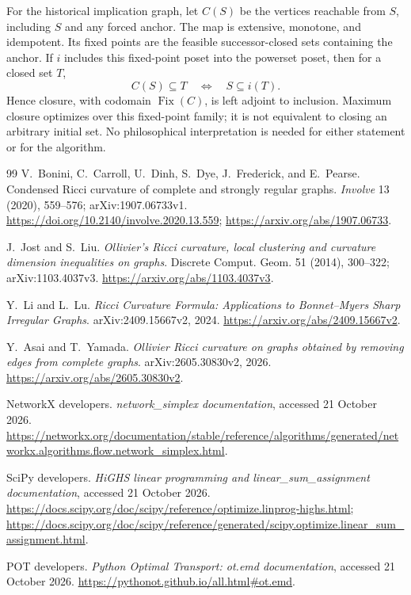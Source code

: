 \documentclass[11pt]{article}
\theoremstyle{remark}
\newcommand{\Fix}{\operatorname{Fix}}
\begin{document}
For the historical implication graph, let $C(S)$ be the vertices reachable from $S$, including $S$ and any forced anchor. The map is extensive, monotone, and idempotent. Its fixed points are the feasible successor-closed sets containing the anchor. If $i$ includes this fixed-point poset into the powerset poset, then for a closed set $T$,
\[
 C(S)\subseteq T\quad\Longleftrightarrow\quad S\subseteq i(T).
\]
Hence closure, with codomain $\Fix(C)$, is left adjoint to inclusion. Maximum closure optimizes over this fixed-point family; it is not equivalent to closing an arbitrary initial set. No philosophical interpretation is needed for either statement or for the algorithm.

\begin{thebibliography}{99}
V.~Bonini, C.~Carroll, U.~Dinh, S.~Dye, J.~Frederick, and E.~Pearse.
Condensed Ricci curvature of complete and strongly regular graphs.
\emph{Involve} 13 (2020), 559--576; arXiv:1907.06733v1.
\url{https://doi.org/10.2140/involve.2020.13.559};
\url{https://arxiv.org/abs/1907.06733}.

J.~Jost and S.~Liu.
\emph{Ollivier's Ricci curvature, local clustering and curvature dimension inequalities on graphs}.
Discrete Comput. Geom. 51 (2014), 300--322; arXiv:1103.4037v3.
\url{https://arxiv.org/abs/1103.4037v3}.

Y.~Li and L.~Lu.
\emph{Ricci Curvature Formula: Applications to Bonnet--Myers Sharp Irregular Graphs}.
arXiv:2409.15667v2, 2024.
\url{https://arxiv.org/abs/2409.15667v2}.

Y.~Asai and T.~Yamada.
\emph{Ollivier Ricci curvature on graphs obtained by removing edges from complete graphs}.
arXiv:2605.30830v2, 2026.
\url{https://arxiv.org/abs/2605.30830v2}.

NetworkX developers. \emph{network\_simplex documentation}, accessed 21 October 2026.
\url{https://networkx.org/documentation/stable/reference/algorithms/generated/networkx.algorithms.flow.network_simplex.html}.

SciPy developers. \emph{HiGHS linear programming and linear\_sum\_assignment documentation}, accessed 21 October 2026.
\url{https://docs.scipy.org/doc/scipy/reference/optimize.linprog-highs.html};
\url{https://docs.scipy.org/doc/scipy/reference/generated/scipy.optimize.linear_sum_assignment.html}.

POT developers. \emph{Python Optimal Transport: ot.emd documentation}, accessed 21 October 2026.
\url{https://pythonot.github.io/all.html#ot.emd}.


\end{thebibliography}
\end{document}
